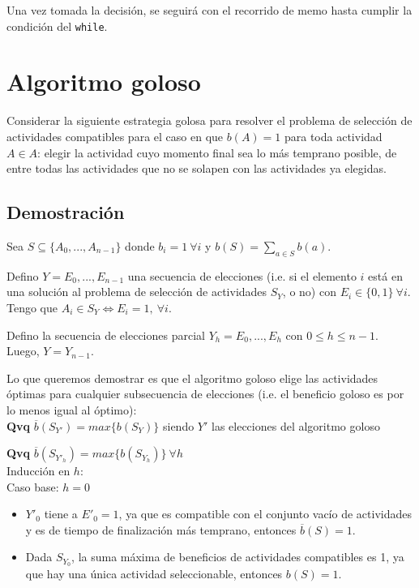 \documentclass[10pt, a4paper]{article}
\begin{document}
Una vez tomada la decisión, se seguirá con el recorrido de memo hasta cumplir la condición del \texttt{while}.

\section{Algoritmo goloso}

Considerar la siguiente estrategia golosa para resolver el problema de selección de actividades compatibles para el caso en que $b(A) = 1$ para toda actividad $A \in A$: elegir la actividad cuyo momento final sea lo más temprano posible, de entre todas las actividades que no se solapen con las actividades ya elegidas.

\subsection{Demostración}
Sea $S \subseteq \{A_0,...,A_{n-1}\}$ donde $b_i = 1 \ \forall i$ y $b(S) = \sum_{a \in S}b(a)$.

Defino $Y = E_0,...,E_{n-1}$ una secuencia de elecciones (i.e. si el elemento $i$ está en una solución al problema de selección de actividades $S_Y$, o no) con $E_i \in \{0, 1\} \ \forall i$. Tengo que $A_i \in S_Y \iff E_i = 1, \ \forall i$.

Defino la secuencia de elecciones parcial $Y_h = E_0,...,E_{h}$ con $0 \leq h \leq n-1$. Luego, $Y = Y_{n-1}$.

Lo que queremos demostrar es que el algoritmo goloso elige las actividades óptimas para cualquier subsecuencia de elecciones (i.e. el beneficio goloso es por lo menos igual al óptimo): \\

\textbf{Qvq} $\overline{b}(S_{Y'}) = max\{b(S_Y)\}$ siendo $Y'$ las elecciones del algoritmo goloso

\textbf{Qvq} $\overline{b}(S_{Y'_h}) = max\{b(S_{Y_h})\} \ \forall h$ \\

Inducción en $h$: \\

Caso base: $h = 0$ 

\begin{itemize}
    \item $Y'_0$ tiene a $E'_0 = 1$, ya que es compatible con el conjunto vacío de actividades y es de tiempo de finalización más temprano, entonces $\overline{b}(S) = 1$.
    \item Dada $S_{Y_0}$, la suma máxima de beneficios de actividades compatibles es 1, ya que hay una única actividad seleccionable, entonces $b(S) = 1$.
\end{itemize}
\end{document}
